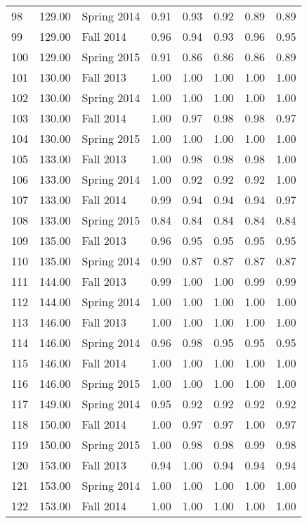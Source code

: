 \documentclass[12pt,]{article}
\begin{document}
\begin{longtable}{l|l|l|l|l|l|l|l}
  98 & 129.00 & Spring 2014 & 0.91 & 0.93 & 0.92 & 0.89 & 0.89 \\ 
  99 & 129.00 & Fall 2014 & 0.96 & 0.94 & 0.93 & 0.96 & 0.95 \\ 
  100 & 129.00 & Spring 2015 & 0.91 & 0.86 & 0.86 & 0.86 & 0.89 \\ 
  101 & 130.00 & Fall 2013 & 1.00 & 1.00 & 1.00 & 1.00 & 1.00 \\ 
  102 & 130.00 & Spring 2014 & 1.00 & 1.00 & 1.00 & 1.00 & 1.00 \\ 
  103 & 130.00 & Fall 2014 & 1.00 & 0.97 & 0.98 & 0.98 & 0.97 \\ 
  104 & 130.00 & Spring 2015 & 1.00 & 1.00 & 1.00 & 1.00 & 1.00 \\ 
  105 & 133.00 & Fall 2013 & 1.00 & 0.98 & 0.98 & 0.98 & 1.00 \\ 
  106 & 133.00 & Spring 2014 & 1.00 & 0.92 & 0.92 & 0.92 & 1.00 \\ 
  107 & 133.00 & Fall 2014 & 0.99 & 0.94 & 0.94 & 0.94 & 0.97 \\ 
  108 & 133.00 & Spring 2015 & 0.84 & 0.84 & 0.84 & 0.84 & 0.84 \\ 
  109 & 135.00 & Fall 2013 & 0.96 & 0.95 & 0.95 & 0.95 & 0.95 \\ 
  110 & 135.00 & Spring 2014 & 0.90 & 0.87 & 0.87 & 0.87 & 0.87 \\ 
  111 & 144.00 & Fall 2013 & 0.99 & 1.00 & 1.00 & 0.99 & 0.99 \\ 
  112 & 144.00 & Spring 2014 & 1.00 & 1.00 & 1.00 & 1.00 & 1.00 \\ 
  113 & 146.00 & Fall 2013 & 1.00 & 1.00 & 1.00 & 1.00 & 1.00 \\ 
  114 & 146.00 & Spring 2014 & 0.96 & 0.98 & 0.95 & 0.95 & 0.95 \\ 
  115 & 146.00 & Fall 2014 & 1.00 & 1.00 & 1.00 & 1.00 & 1.00 \\ 
  116 & 146.00 & Spring 2015 & 1.00 & 1.00 & 1.00 & 1.00 & 1.00 \\ 
  117 & 149.00 & Spring 2014 & 0.95 & 0.92 & 0.92 & 0.92 & 0.92 \\ 
  118 & 150.00 & Fall 2014 & 1.00 & 0.97 & 0.97 & 1.00 & 0.97 \\ 
  119 & 150.00 & Spring 2015 & 1.00 & 0.98 & 0.98 & 0.99 & 0.98 \\ 
  120 & 153.00 & Fall 2013 & 0.94 & 1.00 & 0.94 & 0.94 & 0.94 \\ 
  121 & 153.00 & Spring 2014 & 1.00 & 1.00 & 1.00 & 1.00 & 1.00 \\ 
  122 & 153.00 & Fall 2014 & 1.00 & 1.00 & 1.00 & 1.00 & 1.00 \\ 

\end{longtable}
\end{document}
